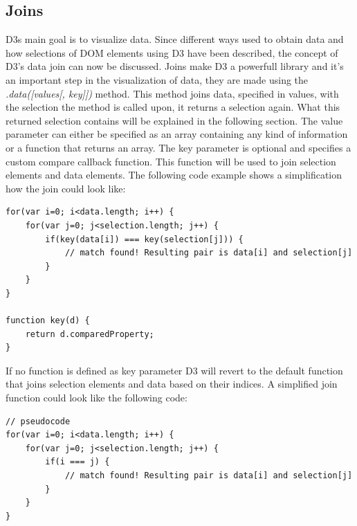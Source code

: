 \documentclass{bioinfo}
\begin{document}
\subsection{Joins} \label{s:joins}
D3s main goal is to visualize data. Since different ways used to obtain data and how selections of DOM elements using D3 have been described, the concept of D3's data join can now be discussed. Joins make D3 a powerfull library and it's an important step in the visualization of data, they are made using the \textit{.data([values[, key]])} method.
This method joins data, specified in values, with the selection the method is called upon, it returns a selection again. What this returned selection contains will be explained in the following section.
\newline
The value parameter can either be specified as an array containing any kind of information or a function that returns an array.
The key parameter is optional and specifies a custom compare callback function.
This function will be used to join selection elements and data elements.
The following code example shows a simplification how the join could look like:
\begin{lstlisting}
for(var i=0; i<data.length; i++) {
	for(var j=0; j<selection.length; j++) {
		if(key(data[i]) === key(selection[j])) {
			// match found! Resulting pair is data[i] and selection[j]
		}
	}
}

function key(d) {
	return d.comparedProperty;
}
\end{lstlisting}
If no function is defined as key parameter D3 will revert to the default function that joins selection elements and data based on their indices.
A simplified join function could look like the following code:
\begin{lstlisting}
// pseudocode
for(var i=0; i<data.length; i++) {
	for(var j=0; j<selection.length; j++) {
		if(i === j) {
			// match found! Resulting pair is data[i] and selection[j]
		}
	}
}
\end{lstlisting}
\end{document}
